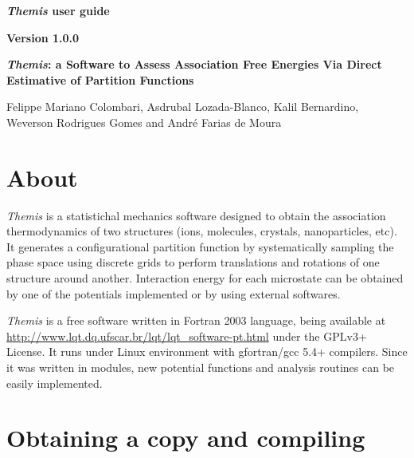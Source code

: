 \documentclass[10pt,a4paper]{report}
\begin{document}
\begin{center}

  \vfill

  \textbf{\Huge{\textit{Themis} user guide}}

  \vfill

  \textbf{\Large{Version 1.0.0}}
  
  \vfill

\end{center}

\newpage

\begin{center}
  
  \vfill

  \noindent

  \textbf{\Large{\textit{Themis}: a Software to Assess Association Free Energies Via Direct Estimative of Partition Functions}}

  \vfill

  {Felippe Mariano Colombari}, {Asdrubal Lozada-Blanco}, {Kalil Bernardino}, {Weverson Rodrigues Gomes} and
  {Andr\'e Farias de Moura} 

  \vfill

\end{center}

\newpage

\chapter{About}

  \textit{Themis} is a statistichal mechanics software designed to obtain the 
association thermodynamics of two structures (ions, molecules, crystals, 
nanoparticles, etc). It generates a configurational partition function by 
systematically sampling the phase space using discrete grids to perform 
translations and rotations of one structure around another. Interaction energy 
for each microstate can be obtained by one of the potentials implemented or 
by using external softwares.

  \textit{Themis} is a free software written in Fortran 2003 language, being 
available at \url{http://www.lqt.dq.ufscar.br/lqt/lqt_software-pt.html} under 
the GPLv3+ License. It runs under Linux environment with gfortran/gcc 5.4+ 
compilers. Since it was written in modules, new potential functions and analysis 
routines can be easily implemented.

\clearpage

\chapter{Obtaining a copy and compiling}
\end{document}
